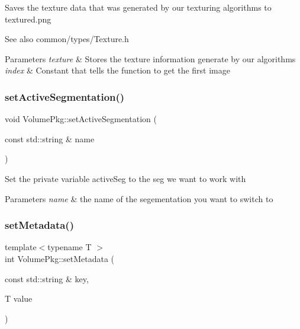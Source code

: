 Saves the texture data that was generated by our texturing algorithms to textured.\+png \begin{DoxySeeAlso}{See also}
common/types/\+Texture.\+h 
\end{DoxySeeAlso}

\begin{DoxyParams}{Parameters}
{\em texture} & Stores the texture information generate by our algorithms \\
\hline
{\em index} & Constant that tells the function to get the first image \\
\hline
\end{DoxyParams}
\hypertarget{classVolumePkg_a8b1fa5d3ca58dbd22ac1a576971bc7a0}{}\label{classVolumePkg_a8b1fa5d3ca58dbd22ac1a576971bc7a0} 
\subsubsection{\texorpdfstring{set\+Active\+Segmentation()}{setActiveSegmentation()}}
{\footnotesize\ttfamily void Volume\+Pkg\+::set\+Active\+Segmentation (\begin{DoxyParamCaption}\item[{const std\+::string \&}]{name }\end{DoxyParamCaption})}

Set the private variable active\+Seg to the seg we want to work with 
\begin{DoxyParams}{Parameters}
{\em name} & the name of the segementation you want to switch to \\
\hline
\end{DoxyParams}
\hypertarget{classVolumePkg_a560d401f04a486c0277e37b3e2607886}{}\label{classVolumePkg_a560d401f04a486c0277e37b3e2607886} 
\subsubsection{\texorpdfstring{set\+Metadata()}{setMetadata()}}
{\footnotesize\ttfamily template$<$typename T $>$ \\
int Volume\+Pkg\+::set\+Metadata (\begin{DoxyParamCaption}\item[{const std\+::string \&}]{key,  }\item[{T}]{value }\end{DoxyParamCaption})\hspace{0.3cm}{\ttfamily [inline]}}

